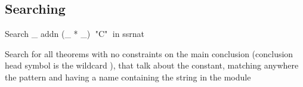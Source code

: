 \begin{landscape}
\begin{small}
\begin{multicols*}{3}[\begin{center}\section*{}\end{center}]
\subsection*{Searching}

\begin{cheat}
Search _ addn (_ * _)$\;$ "C"$\;$ in ssrnat
\end{cheat}
  Search for all theorems with no constraints on
  the main conclusion (conclusion head symbol is the wildcard \C{_}),
  that talk about the  constant, matching anywhere the pattern
  \C{(_ * _)} and having a name containing the string  in the
  module 

% 
% 

\end{multicols*}
\end{small}
\end{landscape}
